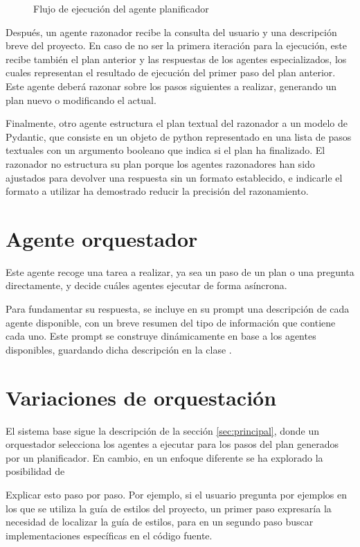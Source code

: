 \begin{figure}[h]
  \centering
  \caption{Flujo de ejecución del agente planificador}
  \label{fig:planner}
\end{figure}
Después, un agente razonador recibe la consulta del usuario y una descripción breve del proyecto. En caso de no ser la primera iteración para la ejecución, este recibe también el plan anterior y las respuestas de los agentes especializados, los cuales representan el resultado de ejecución del primer paso del plan anterior. Este agente deberá razonar sobre los pasos siguientes a realizar, generando un plan nuevo o modificando el actual. 

Finalmente, otro agente estructura el plan textual del razonador a un modelo de Pydantic, que consiste en un objeto de python representado en una lista de pasos textuales con un argumento booleano que indica si el plan ha finalizado. El razonador no estructura su plan porque los agentes razonadores han sido ajustados para devolver una respuesta sin un formato establecido, e indicarle el formato a utilizar ha demostrado reducir la precisión del razonamiento.


\section{Agente orquestador}
Este agente recoge una tarea a realizar, ya sea un paso de un plan o una pregunta directamente, y decide cuáles agentes ejecutar de forma asíncrona.

Para fundamentar su respuesta, se incluye en su prompt una descripción de cada agente disponible, con un breve resumen del tipo de información que contiene cada uno. Este prompt se construye dinámicamente en base a los agentes disponibles, guardando dicha descripción en la clase . 

\section{Variaciones de orquestación}
\label{sec:vars}
El sistema base sigue la descripción de la sección \ref{sec:principal}, donde un orquestador selecciona los agentes a ejecutar para los pasos del plan generados por un planificador. En cambio, en un enfoque diferente se ha explorado la posibilidad de  







Explicar esto paso por paso.
Por ejemplo, si el usuario pregunta por ejemplos en los que se utiliza la guía de estilos del proyecto, un primer paso expresaría la necesidad de localizar la guía de estilos, para en un segundo paso buscar implementaciones específicas en el código fuente.
